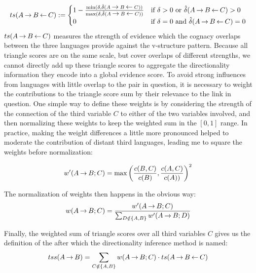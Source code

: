 \begin{equation*}
   ts(A \kern 2pt\hbox{$\rightarrow$}\kern 2pt B \kern 2pt\hbox{$\leftarrow$}\kern 2pt C ) :=
   \begin{cases}
     1 - \frac{\min(\delta,\hat{\delta}(A \kern 2pt\hbox{$\rightarrow$}\kern 2pt B \kern 2pt\hbox{$\leftarrow$}\kern 2pt C))}{\max(\delta,\hat{\delta}(A \kern 2pt\hbox{$\rightarrow$}\kern 2pt B \kern 2pt\hbox{$\leftarrow$}\kern 2pt C))} & \text{if } \delta > 0 \text{ or } \hat{\delta}(A \kern 2pt\hbox{$\rightarrow$}\kern 2pt B \kern 2pt\hbox{$\leftarrow$}\kern 2pt C) > 0\\
     0 & \text{if } \delta = 0 \text{ and } \hat{\delta}(A \kern 2pt\hbox{$\rightarrow$}\kern 2pt B \kern 2pt\hbox{$\leftarrow$}\kern 2pt C) = 0
   \end{cases}
\end{equation*}
\linebreak
$ts(A \kern 2pt\hbox{$\rightarrow$}\kern 2pt B \kern 2pt\hbox{$\leftarrow$}\kern 2pt C)$ measures the strength of evidence which the cognacy overlaps between the three languages provide against the v-structure pattern. Because all triangle scores are on the same scale, but cover overlaps of different strengths, we cannot directly add up these triangle scores to aggregate the directionality information they encode into a global evidence score. To avoid strong influences from languages with little overlap to the pair in question, it is necessary to weight the contributions to the triangle score sum by their relevance to the link in question. One simple way to define these weights is by considering the strength of the connection of the third variable $C$ to either of the two variables involved, and then normalizing these weights to keep the weighted sum in the $[0,1]$ range. In practice, making the weight differences a little more pronounced helped to moderate the contribution of distant third languages, leading me to square the weights before normalization:

\begin{equation*}
 w'(A \kern 2pt\hbox{$\rightarrow$}\kern 2pt B; C) = \max\left(\frac{c(B,C)}{c(B)},\frac{c(A,C)}{c(A))}\right)^2
\end{equation*}

The normalization of weights then happens in the obvious way:
\begin{equation*}
 w(A \kern 2pt\hbox{$\rightarrow$}\kern 2pt B; C) = \frac{w'(A \kern 2pt\hbox{$\rightarrow$}\kern 2pt B; C)}{\sum_{D \notin\{A,B\}} w'(A \kern 2pt\hbox{$\rightarrow$}\kern 2pt B; D)}
\end{equation*}

Finally, the weighted sum of triangle scores over all third variables $C$ gives us the definition of the \textit{} after which the directionality inference method is named: 
\begin{equation*}
 tss(A \kern 2pt\hbox{$\rightarrow$}\kern 2pt B) = \sum_{C \notin\{A,B\}} w(A \kern 2pt\hbox{$\rightarrow$}\kern 2pt B; C) \cdot ts(A \kern 2pt\hbox{$\rightarrow$}\kern 2pt B \kern 2pt\hbox{$\leftarrow$}\kern 2pt C)
\end{equation*}


